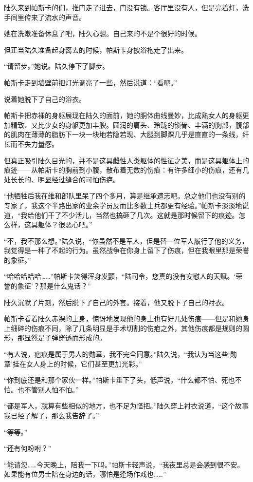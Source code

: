 陆久来到帕斯卡的们，推门走了进去，门没有锁。客厅里没有人，但是亮着灯，洗手间里传来了流水的声音。

她在洗漱准备休息了吧，陆久心想。自己来的不是个很好的时候。

但正当陆久准备起身离去的时候，帕斯卡身披浴袍走了出来。

“请留步。”她说。陆久停下了脚步。

帕斯卡走到墙壁前把灯光调亮了一些，然后说道：“看吧。”

说着她脱下了自己的浴衣。

帕斯卡把赤裸的身躯展现在陆久的面前，她的胴体曲线曼妙，比成熟女人的身躯更加精致、又比少女的身躯更加丰腴。圆润的肩头、玲珑的锁骨、丰满的胸部，腹部的肌肉在薄薄的脂肪下一块一块地若隐若现、大腿到脚踝几乎是直直的一条线，纤长而不失力量感。

但真正吸引陆久目光的，并不是这具雌性人类躯体的性征之美，而是这具躯体上的痕迹——从帕斯卡的胸前到小腹，散布着无数的伤痕：有许多细小的伤痕，还有几处长长的、明显经过缝合的可怕伤疤。

“他牺牲后我在维和部队里呆了四个多月，算是继承遗志吧。总之他们也没有别的专家了，我这个半路出家的业余学员反而比多数士兵都更有经验。”帕斯卡淡淡地说道，“我给他们干了不少活儿，当然也搞砸了几次。这就是那时候留下的痕迹。怎么样，这具躯体？很恶心吧。”

“不，我不那么想。”陆久说，“你虽然不是军人，但是替一位军人履行了他的义务，我觉得是一种了不起的行为。虽然战争在你身上留下了伤痕，但在我眼里那是荣誉的象征。”

“哈哈哈哈哈……”帕斯卡笑得浑身发颤，“陆司令，您真的没有安慰人的天赋。‘荣誉的象征’？那是什么鬼话？”

陆久沉默了片刻，然后脱下了自己的外套。接着，他又脱下了自己的衬衣。

帕斯卡看着陆久赤裸的上身，惊讶地发现他的身上也有好几处伤痕——但是和她身上细碎的伤痕不同，除了几条明显是手术切割的伤疤之外，其他伤痕都是规则的圆形，那显然是子弹穿透而形成的。

“有人说，疤痕是属于男人的勋章，我不完全同意。”陆久说，“我认为当这些‘勋章’挂在女人身上的时候，它们甚至更加光彩。”

“你到底还是和那个家伙一样。”帕斯卡垂下了头，低声说，“什么都不怕、死也不怕。也不管别人怕不怕。”

“都是军人，就算有些相似的地方，也不足为怪把。”陆久穿上衬衣说道，“这个故事我已经了解了，那么我告辞了。”

“等等。”

“还有何吩咐？”

“能请您……今天晚上，陪我一下吗。”帕斯卡轻声说，“我夜里总是会感到很不安。如果能有位男士陪在身边的话，哪怕是逢场作戏也……”

